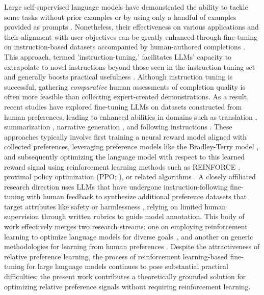 Large self-supervised language models have demonstrated the ability to tackle some tasks without prior examples \citep{radford2019language} or by using only a handful of examples provided as prompts \citep{gpt3,megatron,chowdhery2022palm}. Nonetheless, their effectiveness on various applications and their alignment with user objectives can be greatly enhanced through fine-tuning on instruction-based datasets accompanied by human-authored completions \citep{mishra-etal-2022-cross,sanh2022multitask,chung2022scaling,thoppilan2022lamda}. This approach, termed 'instruction-tuning,' facilitates LLMs’ capacity to extrapolate to novel instructions beyond those seen in the instruction-tuning set and generally boosts practical usefulness \citep{chung2022scaling}. Although instruction tuning is successful, gathering \textit{comparative} human assessments of completion quality is often more feasible than collecting expert-created demonstrations. As a result, recent studies have explored fine-tuning LLMs on datasets constructed from human preferences, leading to enhanced abilities in domains such as translation \citep{kreutzer-etal-2018-reliability}, summarization \citep{stiennon2022learning,ziegler2020finetuning}, narrative generation \citep{ziegler2020finetuning}, and following instructions \citep{ouyang2022training,ramamurthy2023is}. These approaches typically involve first training a neural reward model aligned with collected preferences, leveraging preference models like the Bradley-Terry model \citep{bradley1952rankanalysis}, and subsequently optimizing the language model with respect to this learned reward signal using reinforcement learning methods such as REINFORCE \citep{williams1992reinforce}, proximal policy optimization (PPO; \cite{schulman2017proximal}), or related algorithms \citep{ramamurthy2023is}. A closely affiliated research direction uses LLMs that have undergone instruction-following fine-tuning with human feedback to synthesize additional preference datasets that target attributes like safety or harmlessness \citep{bai2022constitutional}, relying on limited human supervision through written rubrics to guide model annotation. This body of work effectively merges two research streams: one on employing reinforcement learning to optimize language models for diverse goals~\citep{Ranzato2015SequenceLT,paulus2018a,wu2018learning}, and another on generic methodologies for learning from human preferences \citep{christiano2017deep,kupcsik2018learning}. Despite the attractiveness of relative preference learning, the process of reinforcement learning-based fine-tuning for large language models continues to pose substantial practical difficulties; the present work contributes a theoretically grounded solution for optimizing relative preference signals without requiring reinforcement learning.

